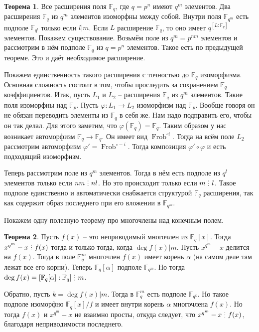 \documentclass[10pt,a4paper,oneside]{book}
\theoremstyle{definition}
\newtheorem{thm}{{\color{red!40!black} Теорема}}
\newcommand{\mb}[1]{\mathbb{#1}}
\newcommand{\Frob}{\operatorname{Frob}}
\newcommand{\di}{\mathop{\,\scalebox{0.85}{\raisebox{-1.2pt}[0.5\height]{\vdots}}\,}}
\def\ffi{\varphi}
\def\thrm{\begin{thm}}
\def\ethrm{\end{thm}}
\begin{document}
\thrm Все расширения поля $\mb F_q$, где $q=p^n$ имеют $q^m$ элементов. Два расширения $\mb F_q$ из $q^m$ элементов изоморфны между собой. Внутри поля $\mb F_{q^m}$ есть подполе $\mb F_{q^l}$ только если $l|m$.
\proof
Если $L$ расширение $\mb F_q$, то оно имеет $q^{[L:\mb F_q]}$ элементов. Покажем существование. Возьмём поле из $q^m=p^{nm}$ элементов и рассмотрим в нём подполе $\mb F_q$ из $q=p^n$ элементов. Такое есть по предыдущей теореме. Это и даёт необходимое расширение. 

Покажем единственность такого расширения с точностью до $\mb F_q$ изоморфизма. Основная сложность состоит в том, чтобы проследить за сохранением $\mb F_q$ коэффициентов. Итак, пусть $L_1$ и $L_2$ -- расширения $\mb F_q$ из $q^m$ элементов. Такие поля изоморфны над $\mb F_p$. Пусть $\ffi \colon L_1 \to L_2$ изоморфизм над $\mb F_p$. Вообще говоря он не обязан переводить элементы из $\mb F_q$ в себя же. Нам надо подправить его, чтобы он так делал. Для этого заметим, что $\ffi(\mb F_q)=\mb F_q$. Таким образом у нас возникает автоморфизм $\mb F_q \to \mb F_q$. Он имеет вид $\Frob^{\circ i}$. Тогда на всём поле $L_2$ рассмотрим автоморфизм $\ffi'=\Frob^{\circ -i}$. Тогда композиция $\ffi'\circ \ffi$ и есть подходящий изоморфизм.

Теперь рассмотрим поле из $q^m$ элементов. Тогда в нём есть подполе из $q^l$ элементов только если $nm \di nl$. Но это происходит только если $m \di l$. Такое подполе единственно и автоматически снабжается структурой $\mb F_q$ расширения, так как содержит образ последнего при его вложении в $\mb F_{q^m}$.
\endproof
\ethrm

Покажем одну полезную теорему про многочлены над конечным полем.

\thrm Пусть $f(x)$ -- это неприводимый многочлен из $\mb F_q[x]$. Тогда $x^{q^m}-x \di f(x)$ тогда и только тогда, когда $\deg f(x) | m$.
\proof Пусть $x^{q^m}-x$ делится на $f(x)$. Тогда в поле $\mb F_q^m$ многочлен $f(x)$ имеет корень $\alpha$ (на самом деле там лежат все его корни). Теперь $\mb F_q[\alpha]$ подполе $\mb F_{q^m}$. Но тогда $\deg f(x) = [\mb F_q[\alpha]: \mb F_q] \di m $. 

Обратно, пусть $k=\deg f(x) | m$. Тогда в $\mb F_q^m$ есть подполе $\mb F_{q^k}$. Но такое подполе изоморфно $\mb F_q[x]/f$ и имеет внутри корень $\alpha$ многочлена $f(x)$. Но тогда $f(x)$ и $x^{q^m}-x$ не взаимно просты, откуда следует, что $x^{q^m}-x \di f(x)$, благодаря неприводимости последнего. 
\endproof
\ethrm
\end{document}
